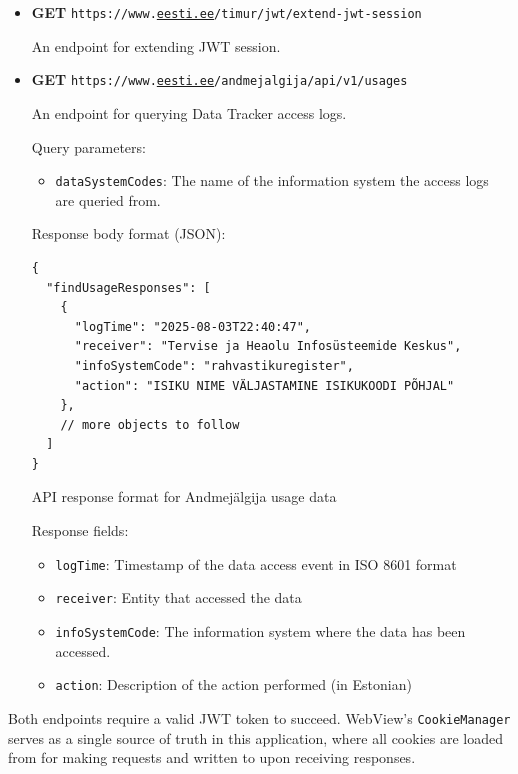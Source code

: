 \begin{itemize}
    \item \textbf{GET} \texttt{https://www.\href{https://www.eesti.ee}{eesti.ee}/timur/jwt/extend-jwt-session}
    
    An endpoint for extending JWT session.
    
    \item \textbf{GET} \texttt{https://www.\href{https://www.eesti.ee}{eesti.ee}/andmejalgija/api/v1/usages}
    
    An endpoint for querying Data Tracker access logs.
    
    Query parameters:
    \begin{itemize}
        \item \texttt{dataSystemCodes}: The name of the information system the access logs are queried from.
    \end{itemize}
    
    \samepage
    Response body format (JSON):
    \begin{listing}[H]
    \begin{verbatim}
{
  "findUsageResponses": [
    {
      "logTime": "2025-08-03T22:40:47",
      "receiver": "Tervise ja Heaolu Infosüsteemide Keskus",
      "infoSystemCode": "rahvastikuregister",
      "action": "ISIKU NIME VÄLJASTAMINE ISIKUKOODI PÕHJAL"
    },
    // more objects to follow
  ]
}
    \end{verbatim}
    \caption{API response format for Andmejälgija usage data}
    \label{lst:andmejalgija-response}
    \end{listing}
    
    Response fields:
    \begin{itemize}
        \item \texttt{logTime}: Timestamp of the data access event in ISO 8601 format
        \item \texttt{receiver}: Entity that accessed the data
        \item \texttt{infoSystemCode}: The information system where the data has been accessed.
        \item \texttt{action}: Description of the action performed (in Estonian)
    \end{itemize}
\end{itemize}

Both endpoints require a valid JWT token to succeed. WebView's \texttt{CookieManager} serves as a single source of truth in this application, where all cookies are loaded from for making requests and written to upon receiving responses.

